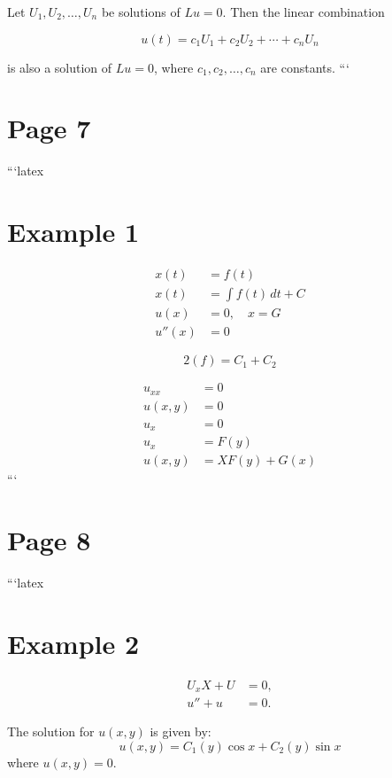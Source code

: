 \documentclass[11pt]{article}
\begin{document}
Let $U_1, U_2, \ldots, U_n$ be solutions of $Lu = 0$. Then the linear combination

\begin{equation}
    u(t) = c_1 U_1 + c_2 U_2 + \cdots + c_n U_n
\end{equation}

is also a solution of $Lu = 0$, where $c_1, c_2, \ldots, c_n$ are constants.
```
\clearpage
\section*{Page 7}

```latex
\section*{Example 1}

\begin{align}
    x(t) &= f(t) \\
    x(t) &= \int f(t) \, dt + C \\
    u(x) &= 0, \quad x = G \\
    u''(x) &= 0
\end{align}

\begin{equation}
    2(f) = C_1 + C_2
\end{equation}

\begin{align}
    u_{xx} &= 0 \\
    u(x, y) &= 0 \\
    u_x &= 0 \\
    u_x &= F(y) \\
    u(x, y) &= X F(y) + G(x)
\end{align}
```
\clearpage
\section*{Page 8}

```latex
\section*{Example 2}

\begin{align}
    U_x X + U &= 0, \\
    u'' + u &= 0.
\end{align}

The solution for \( u(x, y) \) is given by:
\[
u(x, y) = C_1(y) \cos x + C_2(y) \sin x
\]
where \( u(x, y) = 0 \).
\end{document}
